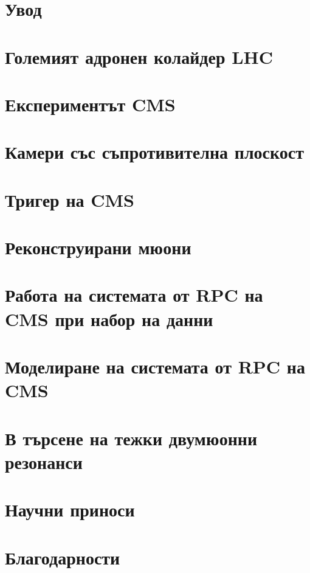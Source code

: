 \documentclass[12pt,a4paper]{book}
\begin{document}

\tableofcontents
\chapter{Увод}

\chapter{Големият адронен колайдер LHC}

\chapter{Експериментът CMS}

\chapter{Камери със съпротивителна плоскост}

\chapter{Тригер на CMS}

\chapter{Реконструирани мюони}

\chapter{Работа на системата от RPC на CMS при набор на данни}

\chapter{Моделиране на системата от RPC на CMS}

\chapter{В търсене на тежки двумюонни резонанси}


\chapter{Научни приноси}


\chapter{Благодарности}


\end{document}

